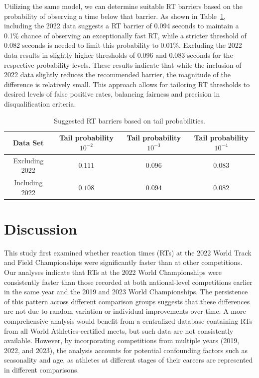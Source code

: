 \documentclass[12pt, letterpaper]{article}
\begin{document}
Utilizing the same model, we can determine suitable RT barriers
based on the probability of observing a time below that barrier. As shown in
Table~\ref{tab:Sim_time}, including the 2022 data suggests a RT
barrier of 0.094 seconds to maintain a 0.1\% chance of observing an
exceptionally fast RT, while a stricter threshold of 0.082 seconds
is needed to limit this probability to 0.01\%. Excluding the 2022 data results
in slightly higher thresholds of 0.096 and 0.083 seconds for the respective
probability levels. These results indicate that while the inclusion of 2022
data slightly reduces the recommended barrier, the magnitude of the difference
is relatively small. This approach allows for tailoring RT
thresholds to desired levels of false positive rates, balancing fairness and
precision in disqualification criteria.


\begin{table}
  \centering
  \caption{Suggested RT barriers based on tail probabilities.}
  \begin{tabular}{c c c c}
   \toprule
   Data Set & Tail probability  $10^{-2}$ & Tail probability  $10^{-3}$ & Tail probability $10^{-4}$ \\
   \midrule
   Excluding 2022 & $0.111$ & $0.096$ & $0.083$ \\
   Including 2022 & $0.108$ & $0.094$ & $0.082$ \\
   \bottomrule
  \end{tabular}
  \label{tab:Sim_time}
\end{table}

\section{Discussion}\label{sec:disc}


This study first examined whether reaction times (RTs) at the 2022
World Track and Field Championships were significantly faster than at
other competitions. Our analyses indicate that RTs at the 2022 World
Championships were consistently faster than those recorded at both
national-level competitions earlier in the same year and the 2019 and
2023 World Championships. The persistence of this pattern across
different comparison groups suggests that these differences are not
due to random variation or individual improvements over time. A more
comprehensive analysis would benefit from a centralized database
containing RTs from all World Athletics-certified meets, but such data
are not consistently available. However, by incorporating competitions
from multiple years (2019, 2022, and 2023), the analysis accounts for
potential confounding factors such as seasonality and age, as athletes
at different stages of their careers are represented in different
comparisons.
\end{document}
